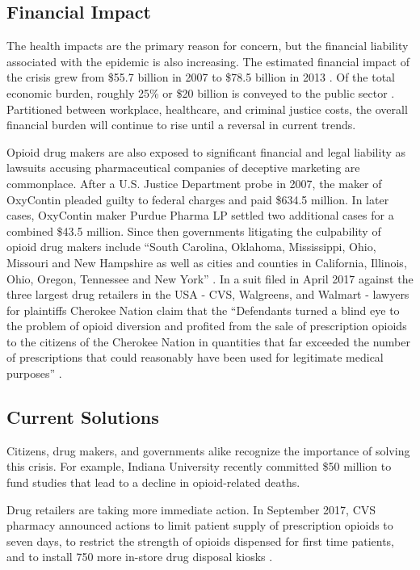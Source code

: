 \documentclass[sigconf]{acmart}
\begin{document}
\subsection{Financial Impact} 
The health impacts are the primary reason for concern, but the financial liability associated with the epidemic is also increasing. The estimated financial impact of the crisis grew from \$55.7 billion in 2007 \cite{Birnbaum01} to \$78.5 billion in 2013 \cite{Florence01}. Of the total economic burden, roughly 25\% or \$20 billion is conveyed to the public sector \cite{Florence01}. Partitioned between workplace, healthcare, and criminal justice costs, the overall financial burden will continue to rise until a reversal in current trends. 

Opioid drug makers are also exposed to significant financial and legal liability as lawsuits accusing pharmaceutical companies of deceptive marketing are commonplace. After a U.S. Justice Department probe in 2007, the maker of OxyContin pleaded guilty to federal charges and paid \$634.5 million. In later cases, OxyContin maker Purdue Pharma LP settled two additional cases for a combined \$43.5 million. Since then governments litigating the culpability of opioid drug makers include ``South Carolina, Oklahoma, Mississippi, Ohio, Missouri and New Hampshire as well as cities and counties in California, Illinois, Ohio, Oregon, Tennessee and New York'' \cite{opsis11}. In a suit filed in April 2017 against the three largest drug retailers in the USA - CVS, Walgreens, and Walmart - lawyers for plaintiffs Cherokee Nation claim that the ``Defendants turned a blind eye to the problem of opioid diversion and profited from the sale of prescription opioids to the citizens of the Cherokee Nation in quantities that far exceeded the number of prescriptions that could reasonably have been used for legitimate medical purposes'' \cite{opsis5}.

\subsection{Current Solutions}
Citizens, drug makers, and governments alike recognize the importance of solving this crisis. For example, Indiana University recently committed \$50 million to fund studies that lead to a decline in opioid-related deaths. 

Drug retailers are taking more immediate action. In September 2017, CVS pharmacy announced actions to limit patient supply of prescription opioids to seven days, to restrict the strength of opioids dispensed for first time patients, and to install 750 more in-store drug disposal kiosks \cite{Charles01} \cite{Hansen01}. 
\end{document}
